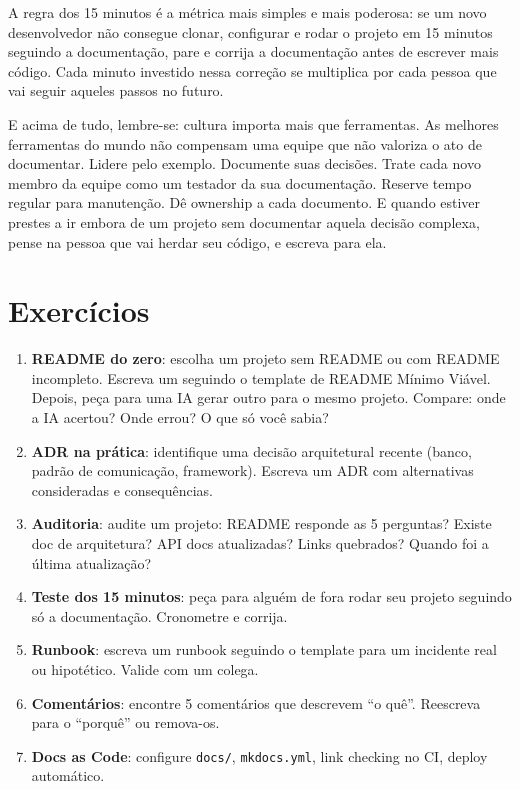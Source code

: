 A regra dos 15 minutos é a métrica mais simples e mais poderosa: se
um novo desenvolvedor não consegue clonar, configurar e rodar o
projeto em 15 minutos seguindo a documentação, pare e corrija a
documentação antes de escrever mais código. Cada minuto investido
nessa correção se multiplica por cada pessoa que vai seguir aqueles
passos no futuro.

E acima de tudo, lembre-se: cultura importa mais que ferramentas.
As melhores ferramentas do mundo não compensam uma equipe que não
valoriza o ato de documentar. Lidere pelo exemplo. Documente suas
decisões. Trate cada novo membro da equipe como um testador da sua
documentação. Reserve tempo regular para manutenção. Dê ownership a
cada documento. E quando estiver prestes a ir embora de um projeto sem
documentar aquela decisão complexa, pense na pessoa que vai herdar seu
código, e escreva para ela.


\section*{Exercícios}

\begin{enumerate}
    \item \textbf{README do zero}: escolha um projeto sem README ou com
    README incompleto. Escreva um seguindo o template de README Mínimo
    Viável. Depois, peça para uma IA gerar outro para o mesmo projeto.
    Compare: onde a IA acertou? Onde errou? O que só você sabia?

    \item \textbf{ADR na prática}: identifique uma decisão arquitetural
    recente (banco, padrão de comunicação, framework). Escreva um ADR com
    alternativas consideradas e consequências.

    \item \textbf{Auditoria}: audite um projeto: README responde as 5
    perguntas? Existe doc de arquitetura? API docs atualizadas? Links
    quebrados? Quando foi a última atualização?

    \item \textbf{Teste dos 15 minutos}: peça para alguém de fora rodar
    seu projeto seguindo só a documentação. Cronometre e corrija.

    \item \textbf{Runbook}: escreva um runbook seguindo o template para
    um incidente real ou hipotético. Valide com um colega.

    \item \textbf{Comentários}: encontre 5 comentários que descrevem ``o
    quê''. Reescreva para o ``porquê'' ou remova-os.

    \item \textbf{Docs as Code}: configure \texttt{docs/},
    \texttt{mkdocs.yml}, link checking no CI, deploy automático.
\end{enumerate}
